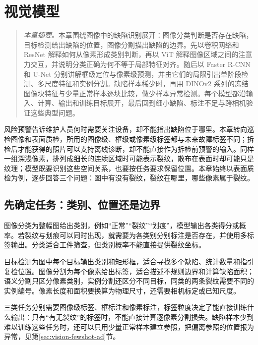\chapter{视觉模型}
\begin{quote}\small
\textit{本章摘要。}本章围绕图像中的缺陷识别展开：图像分类判断是否存在缺陷，目标检测给出缺陷的位置，图像分割描出缺陷的边界。先以卷积网络和 ResNet 解释如何从像素形成类别判断，再以 ViT 解释图像区域之间的注意力交互，并说明分类正确为何不等于局部特征对齐。随后以 Faster R-CNN 和 U-Net 分别讲解框级定位与像素级预测，并由它们的局限引出单阶段检测、多尺度特征和实例分割。缺陷样本稀少时，再用 DINOv2 系列的冻结图像块特征与少量正常样本逐块比较，做少样本异常检测。每个模型都沿输入、计算、输出和训练目标展开，最后回到细小缺陷、标注不足与跨相机验证这些典型问题。
\end{quote}
风险预警告诉维护人员何时需要关注设备，却不能指出缺陷位于哪里。本章转向巡检图像和表面质检，所用的图像级、框级或像素级标签都与未来故障标签不同；拆检后才能获得的照片可以支持离线诊断，却不能直接作为拆检前预警的输入。同样一组深浅像素，排列成细长的连续区域时可能表示裂纹，散布在表面时却可能只是纹理；模型既要识别这些空间关系，也要按任务要求保留位置。本章始终以表面质检为例，逐步回答三个问题：图中有没有裂纹，裂纹在哪里，哪些像素属于裂纹。

\section{先确定任务：类别、位置还是边界}
图像分类为整幅图给出类别，例如“正常”“裂纹”“划痕”，模型输出各类得分或概率。若裂纹与划痕可以同时出现，就需要为各类别分别标注是否存在，并使用多标签输出。分类适合工件筛查，但类别概率不能直接提供裂纹坐标。

目标检测为图中每个目标输出类别和矩形框，适合寻找多个缺陷、统计数量和指引复检位置。图像分割为每个像素给出标签，适合描述不规则边界和计算缺陷面积；语义分割只区分像素类别，实例分割还区分不同目标，同类的两条裂纹需要不同的实例编号。像素长度和面积要换算为物理尺寸，还需要相机标定或已知尺度。

三类任务分别需要图像级标签、框标注和像素标注，标签粒度决定了能直接训练什么输出：只有“有无裂纹”的标签时，不能直接计算逐像素分割损失。缺陷样本少到难以训练这些任务时，还可以只用少量正常样本建立参照，把偏离参照的位置报为异常，见第\ref{sec:vision-fewshot-ad}节。

